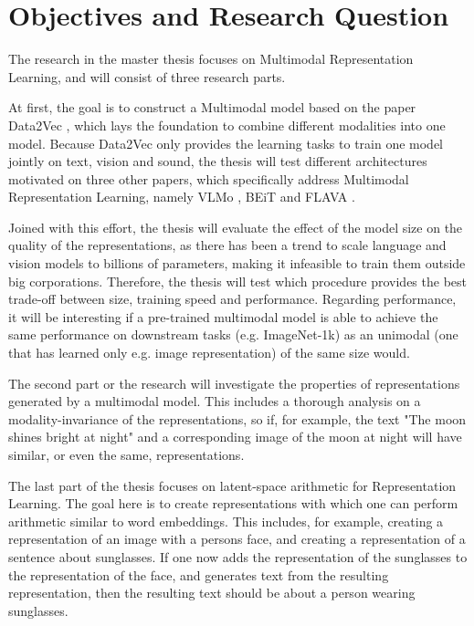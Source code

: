 \chapter{Objectives and Research Question}

The research in the master thesis focuses on Multimodal Representation Learning, and will consist of three research parts.

At first, the goal is to construct a Multimodal model based on the paper Data2Vec \cite{baevski}, 
which lays the foundation to combine different modalities into one model.
Because Data2Vec only provides the learning tasks to train one model jointly on text, vision and sound,
the thesis will test different architectures motivated on three other papers, which specifically
address Multimodal Representation Learning, namely VLMo \cite{bao}, BEiT \cite{wang} and FLAVA \cite{singh}.

Joined with this effort, the thesis will evaluate the effect
of the model size on the quality of the representations, as there has been a trend to 
scale language and vision models to billions of parameters, making it infeasible to train
them outside big corporations. Therefore, the thesis will test which procedure provides the best trade-off between size,
training speed and performance.
Regarding performance, it will be interesting if a pre-trained multimodal model is able to 
achieve the same performance on downstream tasks (e.g. ImageNet-1k) as an 
unimodal (one that has learned only e.g. image representation) of the same size would.

The second part or the research will investigate the properties of
representations generated by a multimodal model. This includes a thorough analysis on a modality-invariance
of the representations, so if, for example, the text "The moon shines bright at night"
and a corresponding image of the moon at night will have similar, or even the same, representations.

The last part of the thesis focuses on latent-space arithmetic for Representation Learning.
The goal here is to create representations with which one can perform arithmetic similar to word embeddings.
This includes, for example, creating a representation of an image with a persons face, and creating
a representation of a sentence about sunglasses. If one now adds the representation of the sunglasses to
the representation of the face, and generates text from the resulting representation, then the resulting text
should be about a person wearing sunglasses.

